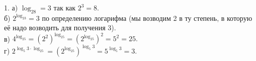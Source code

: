 1. а) $\log_28=3$ так как $2^3=8.$\\
б) $2^{\log_23}=3$ по определению логарифма (мы возводим 2 в ту степень, в которую её надо возводить для получения 3).\\
в) $4^{\log_25}=(2^2)^{\log_25}=(2^{\log_25})^2=5^2=25.$\\
г) $2^{\log_5 3\cdot\log_25}=(2^{\log_25})^{\log_5 3}=5^{\log_5 3}=3.$\\
